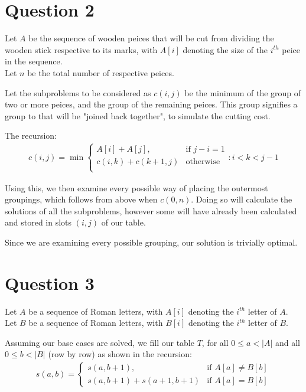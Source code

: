\documentclass{article}
\begin{document}
\pagebreak
\section*{Question 2}
Let $A$ be the sequence of wooden peices that will be cut from dividing the wooden stick respective to its marks, with $A[i]$ denoting the size of the $i^{th}$ peice in the sequence.\\
Let $n$ be the total number of respective peices.

Let the subproblems to be considered as $c(i, j)$ be the minimum of the group of two or more peices, and the group of the remaining peices. This group signifies a group to that will be "joined back together", to simulate the cutting cost.

The recursion:
\begin{align*}
c(i, j) = \min
\begin{cases}
    A[i] + A[j],        & \text{if } j - i = 1\\
    c(i, k) + c(k+1, j) & \text{otherwise}\\
\end{cases}
    : i < k < j - 1
\end{align*}

Using this, we then examine every possible way of placing the outermost groupings, which follows from above when $c(0, n)$. Doing so will calculate the solutions of all the subproblems, however some will have already been calculated and stored in slots $(i, j)$ of our table.

Since we are examining every possible grouping, our solution is trivially optimal.

\section*{Question 3}

Let $A$ be a sequence of Roman letters, with $A[i]$ denoting the $i^{th}$ letter of $A$.\\
Let $B$ be a sequence of Roman letters, with $B[i]$ denoting the $i^{th}$ letter of $B$.


Assuming our base cases are solved, we fill our table $T$, for all $0 \leq a < |A|$ and all $0 \leq b < |B|$ (row by row) as shown in the recursion:
\begin{align*}
s(a, b) =
\begin{cases}
    s(a, b+1),              & \text{if } A[a] \neq B[b]\\
    s(a, b+1) + s(a+1, b+1) & \text{if } A[a] = B[b]
\end{cases}
\end{align*}
\end{document}
